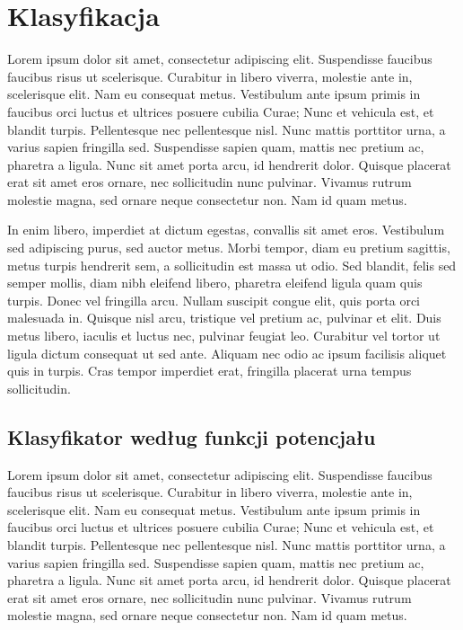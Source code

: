 \section{Klasyfikacja}
Lorem ipsum dolor sit amet, consectetur adipiscing elit. Suspendisse faucibus faucibus risus ut scelerisque. Curabitur in libero viverra, molestie ante in, scelerisque elit. Nam eu consequat metus. Vestibulum ante ipsum primis in faucibus orci luctus et ultrices posuere cubilia Curae; Nunc et vehicula est, et blandit turpis. Pellentesque nec pellentesque nisl. Nunc mattis porttitor urna, a varius sapien fringilla sed. Suspendisse sapien quam, mattis nec pretium ac, pharetra a ligula. Nunc sit amet porta arcu, id hendrerit dolor. Quisque placerat erat sit amet eros ornare, nec sollicitudin nunc pulvinar. Vivamus rutrum molestie magna, sed ornare neque consectetur non. Nam id quam metus.

In enim libero, imperdiet at dictum egestas, convallis sit amet eros. Vestibulum sed adipiscing purus, sed auctor metus. Morbi tempor, diam eu pretium sagittis, metus turpis hendrerit sem, a sollicitudin est massa ut odio. Sed blandit, felis sed semper mollis, diam nibh eleifend libero, pharetra eleifend ligula quam quis turpis. Donec vel fringilla arcu. Nullam suscipit congue elit, quis porta orci malesuada in. Quisque nisl arcu, tristique vel pretium ac, pulvinar et elit. Duis metus libero, iaculis et luctus nec, pulvinar feugiat leo. Curabitur vel tortor ut ligula dictum consequat ut sed ante. Aliquam nec odio ac ipsum facilisis aliquet quis in turpis. Cras tempor imperdiet erat, fringilla placerat urna tempus sollicitudin.

	\subsection{Klasyfikator według funkcji potencjału}
	Lorem ipsum dolor sit amet, consectetur adipiscing elit. Suspendisse faucibus faucibus risus ut scelerisque. Curabitur in libero viverra, molestie ante in, scelerisque elit. Nam eu consequat metus. Vestibulum ante ipsum primis in faucibus orci luctus et ultrices posuere cubilia Curae; Nunc et vehicula est, et blandit turpis. Pellentesque nec pellentesque nisl. Nunc mattis porttitor urna, a varius sapien fringilla sed. Suspendisse sapien quam, mattis nec pretium ac, pharetra a ligula. Nunc sit amet porta arcu, id hendrerit dolor. Quisque placerat erat sit amet eros ornare, nec sollicitudin nunc pulvinar. Vivamus rutrum molestie magna, sed ornare neque consectetur non. Nam id quam metus.

